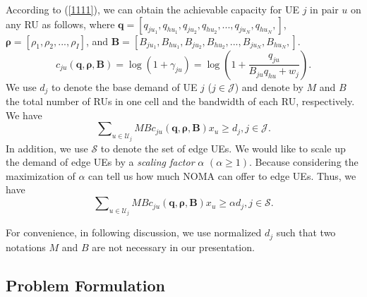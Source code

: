 \documentclass[10pt,journal,final,finalsubmission,twocolumn]{IEEEtran}
\begin{document}
According to (\ref{1111}), we can obtain the achievable capacity for UE $j$ in pair $u$ on any RU as follows, where $\boldsymbol{q}=[q_{ju_1},q_{hu_1},q_{ju_2},q_{hu_2},...,q_{ju_N},q_{hu_N},]$, $\boldsymbol{\rho}=[\rho_1,\rho_2,..., \rho_I]$, and $\boldsymbol{B}=[B_{ju_1},B_{hu_1},B_{ju_2},B_{hu_2},...,B_{ju_N},B_{hu_N},]$.
\begin{equation}
c_{ju}\left (\boldsymbol{q},\boldsymbol{ \rho}, \boldsymbol{B}\right )\!=\!\log \left ( 1\!+\!\gamma_{ju} \right )\!=\!\log \left ( 1\!+\!\frac{q_{ju}}{B_{ju}q_{hu}\!+\!w_j} \right ).
\end{equation}
We use $d_j$ to denote the base demand of UE $j$ ($j \in \mathcal{J}$) and denote by $M$ and $B$ the total number of RUs in one cell and the bandwidth of each RU, respectively. We have
\begin{equation}
\sum\nolimits_{u\in {\mathcal{U}}_j} M B c_{ju}\left (\boldsymbol{q},\boldsymbol{ \rho}, \boldsymbol{B}\right )x_u\geq d_j, j \in \mathcal{J}.
\end{equation}
In addition, we use $\mathcal{S}$ to denote the set of edge UEs. We would like to scale up the demand of edge UEs by a {\em scaling factor} $\alpha$ $\left (\alpha \geq 1\right)$. Because considering the maximization of $\alpha$ can tell us how much NOMA can offer to edge UEs. Thus, we have
\begin{equation}
\sum\nolimits_{u\in {\mathcal{U}}_j} M B c_{ju}\left (\boldsymbol{q},\boldsymbol{ \rho}, \boldsymbol{B}\right )x_u\geq \alpha d_j,j\in \mathcal{S}.
\end{equation}

For convenience, in following discussion, we use normalized $d_j$ such that two notations $M$ and $B$ are not necessary in our presentation.

\subsection{Problem Formulation}\label{MathematicalFormulation}
\end{document}
